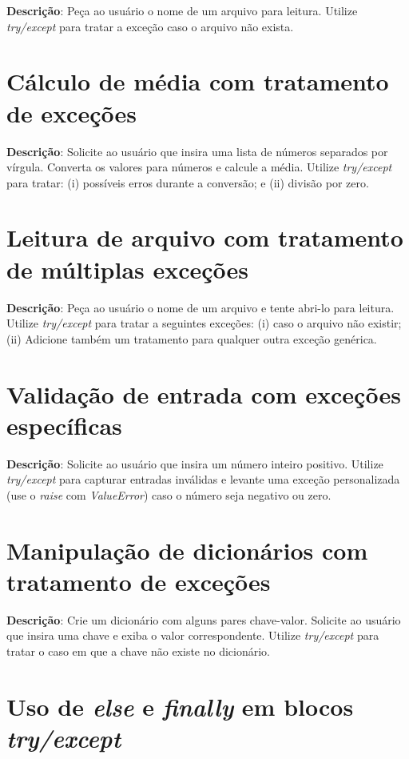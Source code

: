 \textbf{Descrição}:
Peça ao usuário o nome de um arquivo para leitura. Utilize \textit{try/except} para tratar a exceção caso o arquivo não exista.

\section{Cálculo de média com tratamento de exceções}

\textbf{Descrição}:
Solicite ao usuário que insira uma lista de números separados por vírgula. Converta os valores para números e calcule a média. Utilize \textit{try/except} para tratar: (i) possíveis erros durante a conversão; e (ii) divisão por zero.

\section{Leitura de arquivo com tratamento de múltiplas exceções}

\textbf{Descrição}:
Peça ao usuário o nome de um arquivo e tente abri-lo para leitura. Utilize \textit{try/except} para tratar a seguintes exceções: (i) caso o arquivo não existir; (ii) Adicione também um tratamento para qualquer outra exceção genérica.

\section{Validação de entrada com exceções específicas}

\textbf{Descrição}:
Solicite ao usuário que insira um número inteiro positivo. Utilize \textit{try/except} para capturar entradas inválidas e levante uma exceção personalizada (use o \textit{raise} com \textit{ValueError}) caso o número seja negativo ou zero.

\section{Manipulação de dicionários com tratamento de exceções}

\textbf{Descrição}:
Crie um dicionário com alguns pares chave-valor. Solicite ao usuário que insira uma chave e exiba o valor correspondente. Utilize \textit{try/except} para tratar o caso em que a chave não existe no dicionário.

\section{Uso de \textit{else} e \textit{finally} em blocos \textit{try/except}}

